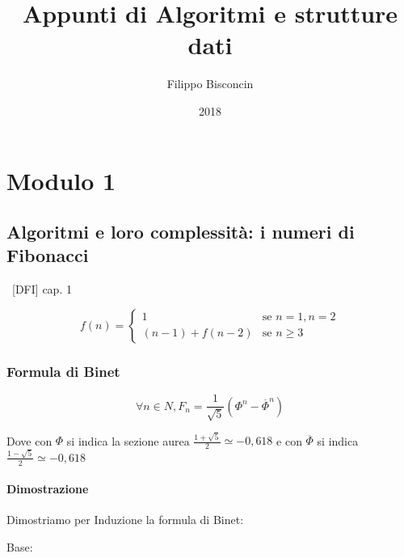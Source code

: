 \documentclass[11pt,a4paper,twoside,openright]{book}
\title{Appunti di Algoritmi e strutture dati}
\author{Filippo Bisconcin}
\date{2018}
\begin{document}
\begin{titlepage}
\maketitle
\end{titlepage}


\tableofcontents

\chapter{Modulo 1}

\section{Algoritmi e loro complessità: i numeri di Fibonacci}

{~{[}DFI{]} cap. 1}

\begin{equation}
f(n) = 
\begin{cases}
1 & \mbox{se } n=1,n=2 \\ 
(n-1)+f(n-2) & \mbox{se } n\geq3 
\end{cases}
\end{equation}

\subsection{Formula di Binet}

\begin{equation}
\forall n \in N, F_n = \frac{1}{\sqrt{5}}(\Phi^n-\overline{\Phi}^n)
\end{equation}

Dove con $\Phi$ si indica la sezione aurea $\frac{1+\sqrt{5}}{2} \simeq -0,618$ e con $\overline{\Phi}$ si indica $\frac{1-\sqrt{5}}{2} \simeq -0,618$

\subsubsection{Dimostrazione}

{Dimostriamo per Induzione la formula di Binet:}

{Base:}
\end{document}
